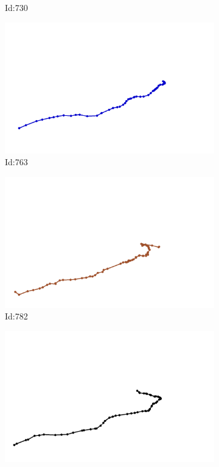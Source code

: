 \documentclass[12pt,twoside]{report}
\begin{document}
\begin{figure}
\begin{subfigure}[b]{0.20\textwidth}
\caption{Id:730}
\end{subfigure}
\begin{subfigure}[b]{0.20\textwidth}
\centering
\includegraphics[width=\textwidth]{../trajectories/763.png}
\caption{Id:763}
\end{subfigure}
\begin{subfigure}[b]{0.20\textwidth}
\centering
\includegraphics[width=\textwidth]{../trajectories/782.png}
\caption{Id:782}
\end{subfigure}
\begin{subfigure}[b]{0.20\textwidth}
\centering
\includegraphics[width=\textwidth]{../trajectories/815.png}

\end{subfigure}
\end{figure}
\end{document}
